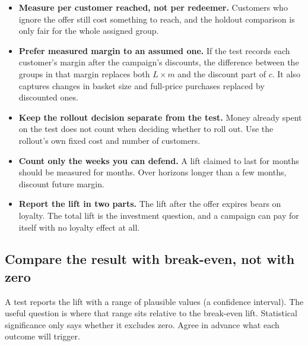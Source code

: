 \documentclass[11pt]{article}
\begin{document}
\begin{itemize}[itemsep=4pt]
\item \textbf{Measure per customer reached, not per redeemer.} Customers who ignore the offer
still cost something to reach, and the holdout comparison is only fair for the whole assigned
group.
\item \textbf{Prefer measured margin to an assumed one.} If the test records each customer's
margin after the campaign's discounts, the difference between the groups in that margin
replaces both $L \times m$ and the discount part of $c$. It also captures changes in basket
size and full-price purchases replaced by discounted ones.
\item \textbf{Keep the rollout decision separate from the test.} Money already spent on the test
does not count when deciding whether to roll out. Use the rollout's own fixed cost and number of
customers.
\item \textbf{Count only the weeks you can defend.} A lift claimed to last for months should be
measured for months. Over horizons longer than a few months, discount future margin.
\item \textbf{Report the lift in two parts.} The lift after the offer expires bears on
loyalty. The total lift is the investment question, and a campaign can pay for itself with no
loyalty effect at all.
\end{itemize}

\subsection{Compare the result with break-even, not with zero}
A test reports the lift with a range of plausible values (a confidence interval). The useful
question is where that range sits relative to the break-even lift. Statistical significance
only says whether it excludes zero. Agree in advance what each outcome will trigger.
\end{document}
